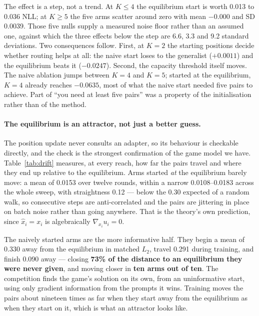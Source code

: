 \documentclass{article}
\begin{document}
The effect is a step, not a trend. At $K \le 4$ the equilibrium start is worth 0.013 to 0.036 NLL; at
$K \ge 5$ the five arms scatter around zero with mean $-0.000$ and SD 0.0039. Those five nulls supply
a measured noise floor rather than an assumed one, against which the three effects below the step are
6.6, 3.3 and 9.2 standard deviations. Two consequences follow. First, at $K=2$ the starting positions
decide whether routing helps at all: the naive start loses to the generalist ($+0.0011$) and the
equilibrium beats it ($-0.0247$). Second, the capacity threshold itself moves. The naive ablation
jumps between $K=4$ and $K=5$; started at the equilibrium, $K=4$ already reaches $-0.0635$, most of
what the naive start needed five pairs to achieve. Part of ``you need at least five pairs'' was a
property of the initialisation rather than of the method.

\paragraph{The equilibrium is an attractor, not just a better guess.} The position update never
consults an adapter, so its behaviour is checkable directly, and the check is the strongest
confirmation of the game model we have. Table~\ref{tab:drift} measures, at every reach, how far the
pairs travel and where they end up relative to the equilibrium. Arms started \emph{at} the
equilibrium barely move: a mean of 0.0153 over twelve rounds, within a narrow 0.0108--0.0183 across
the whole sweep, with straightness 0.12 --- below the 0.30 expected of a random walk, so consecutive
steps are anti-correlated and the pairs are jittering in place on batch noise rather than going
anywhere. That is the theory's own prediction, since $\hat{x}_i = x_i$ is algebraically
$\nabla_{x_i} u_i = 0$.

The naively started arms are the more informative half. They begin a mean of 0.330 away from the
equilibrium in matched $L_2$, travel 0.291 during training, and finish 0.090 away --- closing
\textbf{73\% of the distance to an equilibrium they were never given}, and moving closer in
\textbf{ten arms out of ten}. The competition finds the game's solution on its own, from an
uninformative start, using only gradient information from the prompts it wins. Training moves the
pairs about nineteen times as far when they start away from the equilibrium as when they start on it,
which is what an attractor looks like.
\end{document}
